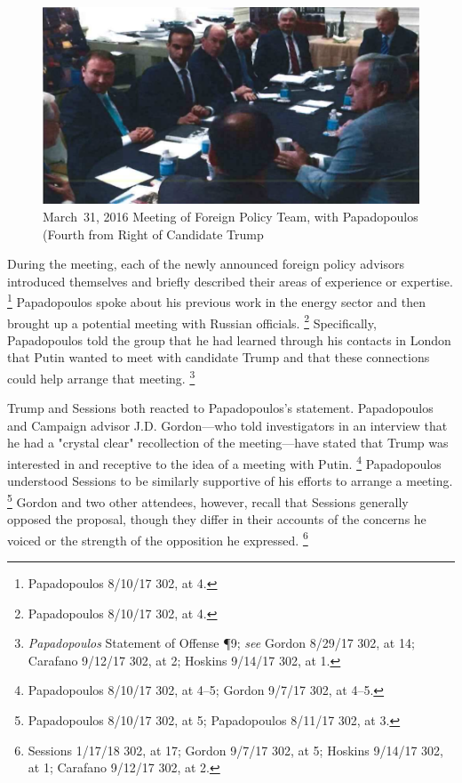 \begin{figure}[t]
    \vspace{-20pt}
    \begin{center}
        \includegraphics[width=5in]{images/p-86-foreign-policy-team.png}%
    \end{center}
    \vspace{-20pt}
    \caption*{March~31, 2016 Meeting of Foreign Policy Team, with Papadopoulos (Fourth from Right of Candidate Trump}
    \vspace{-10pt}
    \label{fig:foreign-policy-team}
\end{figure}

During the meeting, each of the newly announced foreign policy advisors introduced themselves and briefly described their areas of experience or expertise.%
\footnote{Papadopoulos 8/10/17 302, at 4.}
Papadopoulos spoke about his previous work in the energy sector and then brought up a potential meeting with Russian officials.%
\footnote{Papadopoulos 8/10/17 302, at 4.}
Specifically, Papadopoulos told the group that he had learned through his contacts in London that Putin wanted to meet with candidate Trump and that these connections could help arrange that meeting.%
\footnote{\textit{Papadopoulos} Statement of Offense \P 9; \textit{see} Gordon 8/29/17 302, at 14; Carafano 9/12/17 302, at 2; Hoskins 9/14/17 302, at 1.}

Trump and Sessions both reacted to Papadopoulos's statement. Papadopoulos and Campaign advisor J.D. Gordon---who told investigators in an interview that he had a "crystal clear" recollection of the meeting---have stated that Trump was interested in and receptive to the idea of a meeting with Putin.%
\footnote{Papadopoulos 8/10/17 302, at 4--5; Gordon 9/7/17 302, at 4--5.}
Papadopoulos understood Sessions to be similarly supportive of his efforts to arrange a meeting.%
\footnote{Papadopoulos 8/10/17 302, at 5; Papadopoulos 8/11/17 302, at 3.}
Gordon and two other attendees, however, recall that Sessions generally opposed the proposal, though they differ in their accounts of the concerns he voiced or the strength of the opposition he expressed.%
\footnote{Sessions 1/17/18 302, at 17; Gordon 9/7/17 302, at 5; Hoskins 9/14/17 302, at 1; Carafano 9/12/17 302, at 2.}

